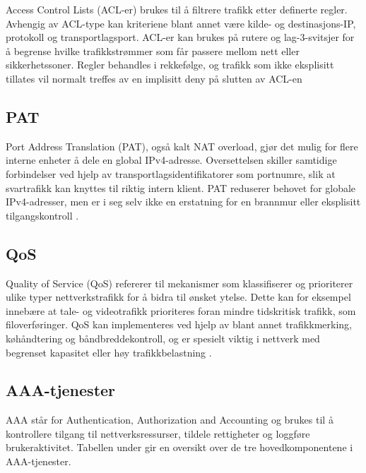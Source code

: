 Access Control Lists (ACL-er) brukes til å filtrere trafikk etter definerte regler. Avhengig av ACL-type kan kriteriene blant annet være kilde- og destinasjons-IP, protokoll og transportlagsport. ACL-er kan brukes på rutere og lag-3-svitsjer for å begrense hvilke trafikkstrømmer som får passere mellom nett eller sikkerhetssoner. Regler behandles i rekkefølge, og trafikk som ikke eksplisitt tillates vil normalt treffes av en implisitt deny på slutten av ACL-en \cite{forsvaret_nettverk_rolle1}

\subsection{PAT}

Port Address Translation (PAT), også kalt NAT overload, gjør det mulig for flere interne enheter å dele en global IPv4-adresse. Oversettelsen skiller samtidige forbindelser ved hjelp av transportlagsidentifikatorer som portnumre, slik at svartrafikk kan knyttes til riktig intern klient. PAT reduserer behovet for globale IPv4-adresser, men er i seg selv ikke en erstatning for en brannmur eller eksplisitt tilgangskontroll \cite{cisco_pat}.

\subsection{QoS}

Quality of Service (QoS) refererer til mekanismer som klassifiserer og prioriterer ulike typer nettverkstrafikk for å bidra til ønsket ytelse. Dette kan for eksempel innebære at tale- og videotrafikk prioriteres foran mindre tidskritisk trafikk, som filoverføringer. QoS kan implementeres ved hjelp av blant annet trafikkmerking, køhåndtering og båndbreddekontroll, og er spesielt viktig i nettverk med begrenset kapasitet eller høy trafikkbelastning \cite{cisco_qos}.

\subsection{AAA-tjenester}

AAA står for Authentication, Authorization and Accounting og brukes til å kontrollere tilgang til nettverksressurser, tildele rettigheter og loggføre brukeraktivitet. Tabellen under gir en oversikt over de tre hovedkomponentene i AAA-tjenester.


